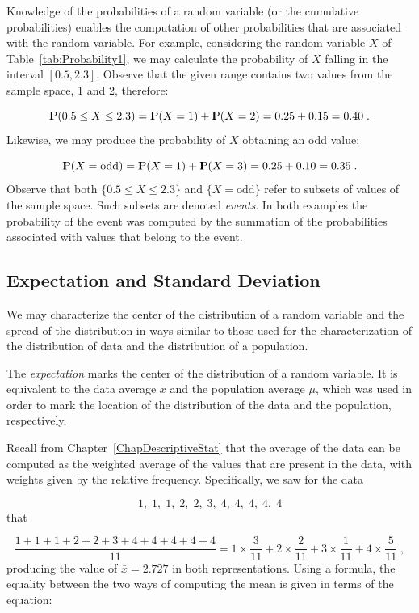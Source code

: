 \documentclass[]{krantz}
\newcommand{\Prob}{{\rm I\kern-.3em P}}
\theoremstyle{definition}
\theoremstyle{definition}
\theoremstyle{definition}
\theoremstyle{remark}
\begin{document}
Knowledge of the probabilities of a random variable (or the cumulative
probabilities) enables the computation of other probabilities that are
associated with the random variable. For example, considering the random
variable \(X\) of Table~\ref{tab:Probability1}, we may calculate the
probability of \(X\) falling in the interval \([0.5, 2.3]\). Observe that
the given range contains two values from the sample space, 1 and 2,
therefore:

\[\Prob(0.5 \leq X \leq 2.3) = \Prob(X=1) + \Prob(X = 2) = 0.25 + 0.15 = 0.40\;.\]
Likewise, we may produce the probability of \(X\) obtaining an odd value:

\[\Prob(X = \mbox{odd}) = \Prob(X=1) + \Prob(X=3) = 0.25 + 0.10 = 0.35\;.\]
Observe that both \(\{0.5 \leq X \leq 2.3\}\) and \(\{X = \mbox{odd}\}\)
refer to subsets of values of the sample space. Such subsets are denoted
\emph{events}. In both examples the probability of the event was computed by
the summation of the probabilities associated with values that belong to
the event.

\hypertarget{expectation-and-standard-deviation}{%
\subsection{Expectation and Standard Deviation}\label{expectation-and-standard-deviation}}

We may characterize the center of the distribution of a random variable
and the spread of the distribution in ways similar to those used for the
characterization of the distribution of data and the distribution of a
population.

The \emph{expectation} marks the center of the distribution of a random
variable. It is equivalent to the data average \(\bar x\) and the
population average \(\mu\), which was used in order to mark the location
of the distribution of the data and the population, respectively.

Recall from Chapter~\ref{ChapDescriptiveStat} that the average of the data
can be computed as the weighted average of the values that are present
in the data, with weights given by the relative frequency. Specifically,
we saw for the data

\[1,\; 1,\; 1,\; 2,\; 2,\; 3,\; 4,\; 4,\; 4,\; 4,\; 4\] that

\[\frac{1 + 1 + 1 + 2 + 2 + 3 + 4 + 4 + 4 + 4 + 4}{11} =
1\times \frac{3}{11} + 2 \times \frac{2}{11} + 3 \times \frac{1}{11} + 4 \times \frac{5}{11}\;,\]
producing the value of \(\bar x =2.727\) in both representations. Using a
formula, the equality between the two ways of computing the mean is
given in terms of the equation:
\end{document}
